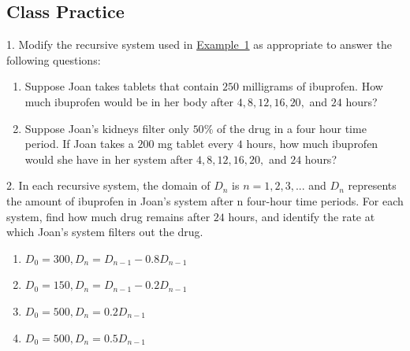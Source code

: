 \documentclass[10pt,]{book}
\theoremstyle{plain}
\theoremstyle{definition}
\theoremstyle{definition}
\theoremstyle{definition}
\numberwithin{equation}{section}
\begin{document}
\subsection[{Class Practice}]{Class Practice}\label{exercises-1}
\begin{exerciselist}
\item[1.]\hypertarget{chapter04-section01-initial-ibuprofen-exercise}{}\hypertarget{p-14}{}%
Modify the recursive system used in \hyperref[ibuprofen-example-one-dose]{Example~1} as appropriate to answer the following questions: \leavevmode%
\begin{enumerate}[label=(\alph*)]
\item\hypertarget{li-1}{}Suppose Joan takes tablets that contain \(250\) milligrams of ibuprofen. How much ibuprofen would be in her body after \(4, 8, 12, 16, 20,\) and \(24\) hours?%
\item\hypertarget{li-2}{}Suppose Joan's kidneys filter only \(50\%\) of the drug in a four hour time period.  If Joan takes a \(200\) mg tablet every \(4\) hours, how much ibuprofen would she have in her system after \(4, 8, 12, 16, 20,\) and \(24\) hours?%
\end{enumerate}
%
\par\smallskip
\item[2.]\hypertarget{exercise-2}{}\hypertarget{p-15}{}%
In each recursive system, the domain of \(D_n\) is \(n=1,2,3, ...\) and \(D_n\) represents the amount of ibuprofen in Joan's system after n four-hour time periods.  For each system, find how much drug remains after \(24\) hours, and identify the rate at which Joan's system filters out the drug. \leavevmode%
\begin{enumerate}[label=(\alph*)]
\item\hypertarget{li-3}{}\(D_0=300, D_n=D_{n-1} - 0.8D_{n-1}\)%
\item\hypertarget{li-4}{}\(D_0=150, D_n=D_{n-1} - 0.2D_{n-1}\)%
\item\hypertarget{li-5}{}\(D_0=500, D_n=0.2D_{n-1}\)%
\item\hypertarget{li-6}{}\(D_0=500, D_n=0.5D_{n-1}\)%
\end{enumerate}
%
\par\smallskip
\end{exerciselist}
\end{document}
